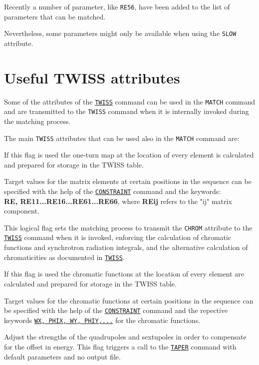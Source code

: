 Recently a number of parameter, like \texttt{RE56}, have been added to the
list of parameters that can be matched. 

Nevertheless, some parameters might only be available when using the
\texttt{SLOW} attribute.
 
\section{Useful TWISS attributes}

Some of the attributes of the \hyperref[chap:twiss]{\texttt{TWISS}} command
can be used in the \texttt{MATCH} command and are transmitted to the
\texttt{TWISS} command when it is internally invoked during the matching process. 

The main \texttt{TWISS} attributes that can be used also in the \texttt{MATCH}
command are:

\begin{madlist}
   If this flag is used the one-turn map at the location of every
  element is calculated and prepared for storage in the TWISS table.
 
  Target values for the matrix elements at certain positions in the
  sequence can be specified with the help of the
  \hyperref[sec:constraint]{\texttt{CONSTRAINT}} command and the keywords:\\
  \textbf{RE, RE11...RE16...RE61...RE66}, where \textbf{REij} refers to
  the "ij" matrix component.
  

   This logical flag sets the matching process to transmit
  the \texttt{CHROM} attribute to the \hyperref[chap:twiss]{\texttt{TWISS}}
  command when it is invoked, enforcing the calculation of chromatic
  functions and synchrotron radiation integrals, and the alternative
  calculation of chromaticities as documented in
  \hyperref[chap:twiss]{\texttt{TWISS}}.

  If this flag is used the chromatic functions at the location of
  every element are calculated and prepared for storage in the TWISS
  table. 
  
  Target values for the chromatic functions at certain positions in the
  sequence can be specified with the help of the
  \hyperref[sec:constraint]{\texttt{CONSTRAINT}} command and the
  repective keywords 
  \hyperref[subsec:tables-chrom]{\texttt{WX, PHIX, WY, PHIY,...}} for
  the chromatic functions. 

   Adjust the strengths of the quadrupoles and sextupoles
  in order to compensate for the offset in energy. This flag triggers a
  call to the \hyperref[chap:taper]{\texttt{TAPER}} command with default
  parameters and no output file. 

\end{madlist}


